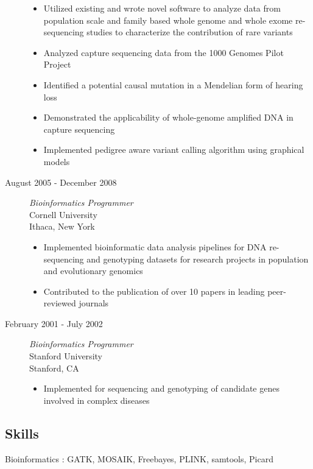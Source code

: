 \documentclass[]{article}
\begin{document}
\begin{description}
\begin{itemize}
	\item Utilized existing and wrote novel software to analyze data from
population scale and family based whole genome and whole exome
re-sequencing studies to characterize the contribution of rare variants
	\item Analyzed capture sequencing data from the 1000 Genomes Pilot Project
	\item  Identified a potential causal mutation in a Mendelian form of hearing loss
	\item Demonstrated the applicability of whole-genome amplified DNA in capture sequencing
	\item  Implemented pedigree aware variant calling algorithm using graphical models
\end{itemize}

\item[August 2005 - December 2008]
\emph{Bioinformatics Programmer}\\
Cornell University \\
Ithaca, New York

\begin{itemize}
	\item Implemented bioinformatic data analysis pipelines for DNA re-sequencing
and genotyping datasets for research projects in population and
evolutionary genomics 
	\item Contributed to the publication of over 10 papers in leading peer-reviewed journals
	\end{itemize}

\item[February 2001 - July 2002]
\emph{Bioinformatics Programmer}\\
Stanford University \\
Stanford, CA
\begin{itemize}
	\item Implemented for sequencing and genotyping of
candidate genes involved in complex diseases
\end{itemize}

\end{description}

\subsection{Skills}\label{skills}

Bioinformatics : GATK, MOSAIK, Freebayes, PLINK, samtools, Picard
\end{document}
